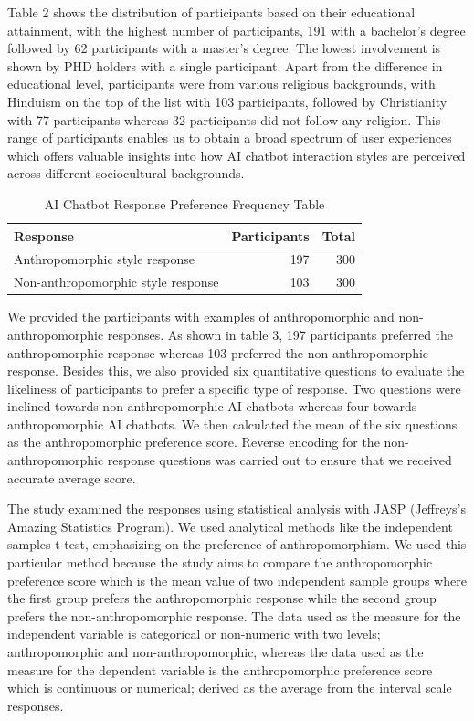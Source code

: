 \documentclass[conference]{IEEEtran}
\begin{document}
Table 2 shows the distribution of participants based on their educational attainment, with the highest number of participants, 191 with a bachelor’s degree followed by 62 participants with a master’s degree. The lowest involvement is shown by PHD holders with a single participant. Apart from the difference in educational level, participants were from various religious backgrounds, with Hinduism on the top of the list with 103 participants, followed by Christianity with 77 participants whereas 32 participants did not follow any religion. This range of participants enables us to obtain a broad spectrum of user experiences which offers valuable insights into how AI chatbot interaction styles are perceived across different sociocultural backgrounds.

\begin{table}[ht]
    \centering
    \caption{AI Chatbot Response Preference Frequency Table}
    \label{tab:anthropomorphicTest}
    \begin{tabular}{lrr}
        \toprule
        \textbf{Response} & \textbf{Participants} & \textbf{Total} \\
        \midrule
        Anthropomorphic style response & 197 & 300 \\
		Non-anthropomorphic style response & 103 & 300 \\
        \bottomrule
    \end{tabular}
\end{table}

We provided the participants with examples of anthropomorphic and non-anthropomorphic responses. As shown in table 3, 197 participants preferred the anthropomorphic response whereas 103 preferred the non-anthropomorphic response. Besides this, we also provided six quantitative questions to evaluate the likeliness of participants to prefer a specific type of response. Two questions were inclined towards non-anthropomorphic AI chatbots whereas four towards anthropomorphic AI chatbots. We then calculated the mean of the six questions as the anthropomorphic preference score. Reverse encoding for the non-anthropomorphic response questions was carried out to ensure that we received accurate average score. \par
The study examined the responses using statistical analysis with JASP (Jeffreys's Amazing Statistics Program). We used analytical methods like the independent samples t-test, emphasizing on the preference of anthropomorphism. We used this particular method because the study aims to compare the anthropomorphic preference score which is the mean value of two independent sample groups where the first group prefers the anthropomorphic response while the second group prefers the non-anthropomorphic response. The data used as the measure for the independent variable is categorical or non-numeric with two levels; anthropomorphic and non-anthropomorphic, whereas the data used as the measure for the dependent variable is the anthropomorphic preference score which is continuous or numerical; derived as the average from the interval scale responses. \\
\end{document}
